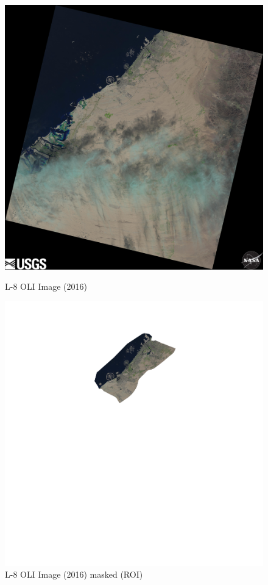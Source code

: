 \begin{figure}[h!]
\centering
\begin{minipage}{.5\textwidth}
	\centering
	\includegraphics[width=\textwidth-3em]{code/imagedata/L8OLI_TIRS/LC81600432016352LGN00.jpg}
	\caption{L-8 OLI Image (2016)}
	\label{fig:L8OLI_16}
\end{minipage}%
\begin{minipage}{.5\textwidth}
	\centering
	\includegraphics[width=\textwidth-3em]{code/imagedata/L8OLI_TIRS/LC81600432016352LGN00.png}
	\caption{L-8 OLI Image (2016) masked (ROI)}
	\label{fig:L8_OLI_16_masked}
\end{minipage}
\end{figure}

